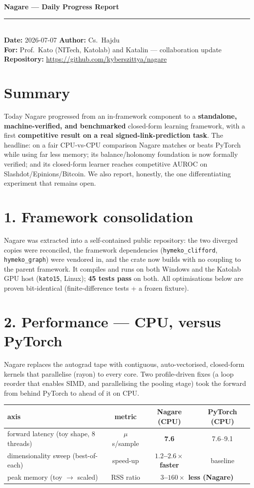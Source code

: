 \documentclass[11pt]{article}
\begin{document}
{\large\textbf{Nagare --- Daily Progress Report}}\\[2pt]
\textcolor{nb}{\rule{\textwidth}{0.8pt}}\\[2pt]
\textbf{Date:} 2026-07-07 \hfill \textbf{Author:} Cs.\ Hajdu\\
\textbf{For:} Prof.\ Kato (NITech, Katolab) and Katalin --- collaboration update\\
\textbf{Repository:} \url{https://github.com/kyberszittya/nagare}

\section*{Summary}
Today Nagare progressed from an in-framework component to a \textbf{standalone,
machine-verified, and benchmarked} closed-form learning framework, with a first
\textbf{competitive result on a real signed-link-prediction task}. The headline:
on a fair CPU-vs-CPU comparison Nagare matches or beats PyTorch while using far
less memory; its balance/holonomy foundation is now formally verified; and its
closed-form learner reaches competitive AUROC on Slashdot/Epinions/Bitcoin. We
also report, honestly, the one differentiating experiment that remains open.

\section*{1. Framework consolidation}
Nagare was extracted into a self-contained public repository: the two diverged
copies were reconciled, the framework dependencies (\texttt{hymeko\_clifford},
\texttt{hymeko\_graph}) were vendored in, and the crate now builds with no coupling
to the parent framework. It compiles and runs on both Windows and the Katolab GPU
host (\texttt{kato15}, Linux); \textbf{45 tests pass} on both. All optimisations
below are proven bit-identical (finite-difference tests + a frozen fixture).

\section*{2. Performance --- CPU, versus PyTorch}
Nagare replaces the autograd tape with contiguous, auto-vectorised, closed-form
kernels that parallelise (rayon) to every core. Two profile-driven fixes (a loop
reorder that enables SIMD, and parallelising the pooling stage) took the forward
from behind PyTorch to ahead of it on CPU.

\begin{center}\small
\begin{tabular}{lccc}
\toprule
axis & metric & Nagare (CPU) & PyTorch (CPU) \\
\midrule
forward latency (toy shape, 8 threads) & $\mu$s/sample & \textbf{7.6} & 7.6--9.1 \\
dimensionality sweep (best-of-each) & speed-up & \textbf{$1.2$--$2.6\times$ faster} & baseline \\
peak memory (toy $\to$ scaled) & RSS ratio & \multicolumn{2}{c}{\textbf{$3$--$160\times$ less (Nagare)}} \\
\bottomrule
\end{tabular}
\end{center}
\end{document}
